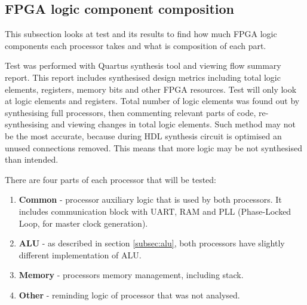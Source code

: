 \subsection{FPGA logic component composition}
This subsection looks at test and its results to find how much FPGA logic components each processor takes and what is composition of each part.

Test was performed with Quartus synthesis tool and viewing flow summary report. This report includes synthesised design metrics including total logic elements, registers, memory bits and other FPGA resources. Test will only look at logic elements and registers. Total number of logic elements was found out by synthesising full processors, then commenting relevant parts of code, re-synthesising and viewing changes in total logic elements. Such method may not be the most accurate, because during HDL synthesis circuit is optimised an unused connections removed. This means that more logic may be not synthesised than intended. 

There are four parts of each processor that will be tested: 
\begin{enumerate}
	\item \textbf{Common} - processor auxiliary logic that is used by both processors. It includes communication block with UART, RAM and PLL (Phase-Locked Loop, for master clock generation). 
	\item \textbf{ALU} - as described in section \ref{subsec:alu}, both processors have slightly different implementation of ALU.
	\item \textbf{Memory} - processors memory management, including stack.
	\item \textbf{Other} - reminding logic of processor that was not analysed.
\end{enumerate}


